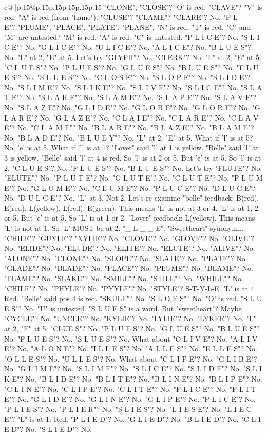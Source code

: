 \documentclass{article}
\begin{document}
{\begin{supertabular}{c@{$\;$}|p{.15\linewidth}@{}p{.15\linewidth}p{.15\linewidth}p{.15\linewidth}p{.15\linewidth}p{.15\linewidth}}
{{{"CLONE", "CLOSE"? 'O' is red. "CLAVE"? "V" is red. "A" is red (from "flame"). "CLUSE"? "CLAME"? "CLARE"? No. "P L \_ \_ E"? "PLUME", "PLACE", "PLATE", "PLANE". "N" is red. "T" is red. "C" and "M" are untested? "M" is red. "A" is red. "C" is untested. "P L I C E"? No. "S L I C E"? No. "G L I C E"? No. "U L I C E"? No. "A L I C E"? No. "B L U E S"? No. "L" at 2, "E" at 5. Let's try "GLYPH"? No. "CLERK"? No. "L" at 2, "E" at 5. "C L U E S"? No. "P L U E S"? No. "G L U E S"? No. "B L U E S"? No. "F L U E S"? No. "S L U E S"? No. "C L O S E"? No. "S L O P E"? No. "S L I D E"? No. "S L I M E"? No. "S L I K E"? No. "S L I V E"? No. "S L I C E"? No. "S L A T E"? No. "S L A R E"? No. "S L A M E"? No. "S L A P E"? No. "S L A V E"? No. "S L A Z E"? No. "G L I D E"? No. "G L O B E"? No. "G L O R E"? No. "G L A R E"? No. "G L A Z E"? No. "C L A I E"? No. "C L A R E"? No. "C L A V E"? No. "C L A M E"? No. "B L A R E"? No. "B L A Z E"? No. "B L A M E"? No. "B L A D E"? No. "B L U E Y"? No. "L" at 2, "E" at 5. What if 'l' is at 5? No, 'e' is at 5. What if 'l' is at 1? "Lover" said 'l' at 1 is yellow. "Belle" said 'l' at 3 is yellow. "Belle" said 'l' at 4 is red. So 'l' is at 2 or 5. But 'e' is at 5. So 'l' is at 2. "C L U E S"? No. "F L U E S"? No. "B L U E S"? No. Let's try "FLUTE"? No. "ELUTE"? No. "P L U T E"? No. "G L U T E"? No. "C L U T E"? No. "P L U M E"? No. "G L U M E"? No. "C L U M E"? No. "P L U C E"? No. "D L U C E"? No. "D U L C E"? No. "L" at 3. Not 2. Let's re{-}examine "belle" feedback: B(red), E(red), L(yellow), L(red), E(green). This means 'L' is not at 3 or 4. 'L' is at 1, 2 or 5. But 'e' is at 5. So 'L' is at 1 or 2. "Lover" feedback: L(yellow). This means 'L' is not at 1. So 'L' MUST be at 2. "\_ L \_ \_ E". "Sweetheart" synonym... "CHILE"? "GUYLE"? "XYLIE"? No. "CLOVE"? No. "GLOVE"? No. "OLIVE"? No. "ELIDE"? No. "ELUDE"? No. "ELITE"? No. "ELUTE"? No. "ALIVE"? No. "ALONE"? No. "CLONE"? No. "SLOPE"? No. "SLATE"? No. "PLATE"? No. "GLADE"? No. "BLADE"? No. "PLACE"? No. "PLUME"? No. "BLAME"? No. "FLAME"? No. "SLAKE"? No. "SMILE"? No. "STILE"? No. "WHILE"? No. "CHILE"? No. "PHYLE"? No. "PYYLE"? No. "STYLE"? S{-}T{-}Y{-}L{-}E. 'L' is at 4. Red. "Belle" said pos 4 is red. "SKULE"? No. "S L O E S"? No. "O" is red. "S L U E S"? No. "U" is untested. "S L U E S" is a word. But "sweetheart"? Maybe "CYCLE"? No. "UNCLE"? No. "KYLIE"? No. "LYLIE"? No. "LYKEE"? No. "L" at 2, "E" at 5. "CLUE S"? No. "P L U E S"? No. "G L U E S"? No. "B L U E S"? No. "F L U E S"? No. "S L U E S"? No. What about "O L I V E"? No. "A L I V E"? No. "A L O N E"? No. "I L L E S"? No. "A L L E S"? No. "E L L E S"? No. "O L L E S"? No. "U L L E S"? No. What about "C L I P E"? No. "G L I B E"? No. "G L I M E"? No. "S L I M E"? No. "S L I C E"? No. "S L I D E"? No. "S L I K E"? No. "B L I D E"? No. "B L I T E"? No. "B L I N E"? No. "B L I P E"? No. "C L I N E"? No. "C L I P E"? No. "C L I T E"? No. "F L I C E"? No. "F L I T E"? No. "G L I D E"? No. "G L I N E"? No. "G L I P E"? No. "P L I C E"? No. "P L I E S"? No. "P L I E R"? No. "S L I E S"? No. "L I E S E"? No. "L I E G E"? "L" is at 1. Red. "P L I E D"? No. "G L I E D"? No. "B L I E D"? No. "C L I E D"? No. "S L I E D"? No. }}}
\end{supertabular}}
\end{document}

